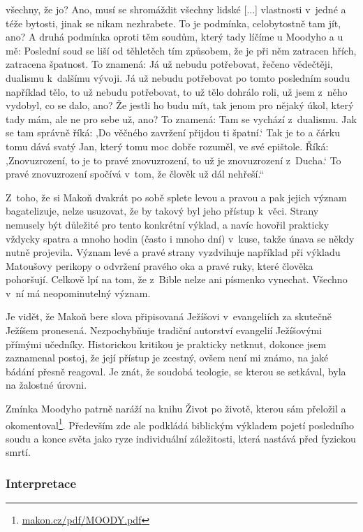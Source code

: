 \begin{enumerate}
{{všechny, že jo? Ano, musí se shromáždit všechny lidské [...]
vlastnosti v~jedné a téže bytosti, jinak se nikam nezhrabete. To
je podmínka, celobytostně tam jít, ano? A druhá podmínka oproti těm soudům,
který tady líčíme u Moodyho a u mě: Poslední soud se liší od těhletěch tím
způsobem, že je při něm zatracen hřích, zatracena špatnost. To znamená: Já už
nebudu potřebovat, řečeno vědečtěji, dualismu k~dalšímu vývoji. Já už nebudu
potřebovat po tomto posledním soudu například tělo, to už nebudu potřebovat, to
už tělo dohrálo roli, už jsem z~něho vydobyl, co se dalo, ano? Že jestli ho budu
mít, tak jenom pro nějaký úkol, který tady mám, ale ne pro sebe už, ano? To
znamená: Tam se vychází z~dualismu. Jak se tam správně říká: ,Do věčného
zavržení přijdou ti špatní.` Tak je to a čárku tomu dává svatý Jan, který tomu
moc dobře rozuměl, ve své epištole. Říká: ,Znovuzrození, to je to pravé
znovuzrození, to už je znovuzrození z~Ducha.` To pravé znovuzrození spočívá
v~tom, že člověk už dál nehřeší.``
}

Z~toho, že si Makoň dvakrát po sobě splete levou a pravou a pak jejich význam
bagatelizuje, nelze usuzovat, že by takový byl jeho přístup k~věci. Strany
nemusely být důležité pro tento konkrétní výklad, a navíc hovořil prakticky
vždycky spatra a mnoho hodin (často i mnoho dní) v~kuse, takže únava se někdy
nutně projevila. Význam levé a pravé strany vyzdvihuje například při výkladu
Matoušovy perikopy o odvržení pravého oka a pravé ruky, které člověka pohoršují.
Celkově lpí na tom, že z~Bible nelze ani písmenko vynechat. Všechno v~ní má
neopominutelný význam.

Je vidět, že Makoň bere slova připisovaná Ježíšovi v~evangeliích za skutečně
Ježíšem pronesená. Nezpochybňuje tradiční autorství evangelií Ježíšovými přímými
učedníky. Historickou kritikou je prakticky netknut, dokonce jsem zaznamenal
postoj, že její přístup je zcestný, ovšem není mi známo, na jaké bádání přesně
reagoval. Je znát, že soudobá teologie, se kterou se setkával, byla na žalostné
úrovni.

Zmínka Moodyho patrně naráží na knihu Život po životě\cite{moody1975life},
kterou sám přeložil a okomentoval\footnote{\url{makon.cz/pdf/MOODY.pdf}}.
Především zde ale podkládá biblickým výkladem pojetí posledního soudu a konce
světa jako ryze individuální záležitosti, která nastává před fyzickou smrtí.

}

\end{enumerate}

\subsubsection*{Interpretace}

